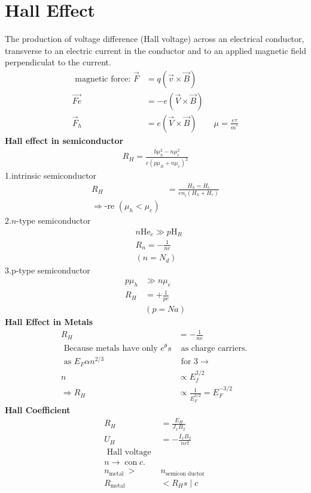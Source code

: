 \section{Hall Effect}
The production of voltage difference (Hall voltage) across an electrical conductor, transverse to an electric current in the conductor and to an applied magnetic field perpendiculat to the current.
\begin{align*}
\text { magnetic force: } \vec{F}&=q(\vec{v} \times \vec{B})\\
\overrightarrow{F e}&=-e(\vec{V} \times \vec{B})\\
\vec{F}_{h}&=e(\vec{V} \times \vec{B})\qquad \mu=\frac{e \tau}{m^{*}}
\end{align*}
\textbf{Hall effect in semiconductor}
\begin{align*}
R_{H}=\frac{b \mu_{h}^{2}-n \mu_{e}^{2}}{e\left(p \mu_{R}+n \mu_{e}\right)^{2}}
\end{align*}
1.\quad intrinsic semiconductor
\begin{align*}
R_{H}&=\frac{H_{h}=H_{e}}{e n_{i}\left(H_{h}+H_{e}\right)}\\
\Rightarrow \text {-re }\left(\mu_{h}<\mu_{e}\right)
\end{align*}
2.$n$-type semiconductor
\begin{align*}
&n \mathrm{He}_{e} \gg p \mathrm{H}_{R}\\
&R_{n}=-\frac{1}{n e}\\
&\left(n=N_{d}\right)
\end{align*}
3.p-type semiconductor
\begin{align*}
p \mu_{h} &\gg n \mu_{e}\\
R_{H}&=+\frac{1}{p e}\\
&(p=N a)
\end{align*}
\textbf{Hall Effect in Metals}
\begin{align*}
R_{H}&=-\frac{1}{n e}\\
\text { Because metals have only } e^{\theta} s&\text { as charge carriers. }\\
\text { as } E_{F} \alpha n^{2 / 3} &\text { for } 3 \rightarrow\\
n &\propto E_{f}^{3 / 2}\\
\Rightarrow R_{H}& \propto \frac{1}{E_{F}^{3 / 2}}=E_{F}^{-3 / 2}
\end{align*}
\textbf{Hall Coefficient}
\begin{align*}
R_{H}&=\frac{E_{H}}{J_{x} B_{2}}\\
U_{H}&=-\frac{I_{x} B_{2}}{n e t}\\
\text { Hall voltage }&\\
n \rightarrow \operatorname{con} c .&\\
n_{\text {metal }}>&n_{\text {semicon ductor }}\\
R_{\text {metal }}&<R_{H} s\mid c
\end{align*}
